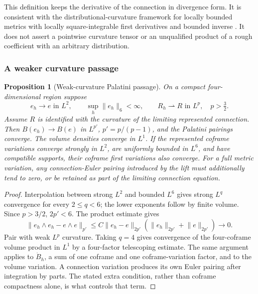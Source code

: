 \documentclass[11pt]{article}
\numberwithin{equation}{section}
\newtheorem{proposition}[proposition]{Proposition}
\theoremstyle{definition}
\theoremstyle{remark}
\newcommand{\norm}[1]{\lVert#1\rVert}
\begin{document}
This definition keeps the derivative of the connection in divergence form. It is consistent with the distributional-curvature framework for locally bounded metrics with locally square-integrable first derivatives and bounded inverse \cite{LeFlochMardare2007}. It does not assert a pointwise curvature tensor or an unqualified product of a rough coefficient with an arbitrary distribution.

\subsubsection{A weaker curvature passage}

\begin{proposition}[Weak-curvature Palatini passage]
\label{prop:weak-palatini}
On a compact four-dimensional region suppose
\begin{equation}
 e_h\to e\text{ in }L^2,\qquad
 \sup_h\norm{e_h}_6<\infty,\qquad
 R_h\rightharpoonup R\text{ in }L^p,
 \quad p>\tfrac32.
 \label{eq:Palatini-hypotheses}
\end{equation}
Assume $R$ is identified with the curvature of the limiting represented connection. Then $B(e_h)\to B(e)$ in $L^{p'}$, $p'=p/(p-1)$, and the Palatini pairings converge. The volume densities converge in $L^1$. If the represented coframe variations converge strongly in $L^2$, are uniformly bounded in $L^6$, and have compatible supports, their coframe first variations also converge. For a full metric variation, any connection-Euler pairing introduced by the lift must additionally tend to zero, or be retained as part of the limiting connection equation.
\end{proposition}
\begin{proof}
Interpolation between strong $L^2$ and bounded $L^6$ gives strong $L^q$ convergence for every $2\le q<6$; the lower exponents follow by finite volume. Since $p>3/2$, $2p'<6$. The product estimate gives
\[
 \norm{e_h\wedge e_h-e\wedge e}_{p'}
 \le C\norm{e_h-e}_{2p'}(\norm{e_h}_{2p'}+\norm e_{2p'})\to0.
\]
Pair with weak $L^p$ curvature. Taking $q=4$ gives convergence of the four-coframe volume product in $L^1$ by a four-factor telescoping estimate. The same argument applies to $\dot B_h$, a sum of one coframe and one coframe-variation factor, and to the volume variation. A connection variation produces its own Euler pairing after integration by parts. The stated extra condition, rather than coframe compactness alone, is what controls that term.
\end{proof}
\end{document}
